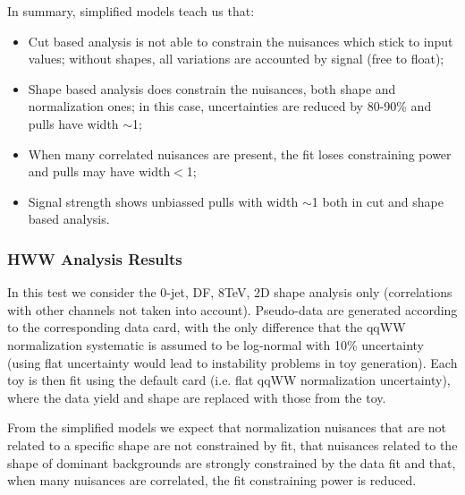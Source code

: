 In summary, simplified models teach us that:
\begin{itemize}
\item Cut based analysis is not able to constrain the nuisances which stick to input values; 
without shapes, all variations are accounted by signal (free to float);
\item Shape based analysis does constrain the nuisances, both shape and normalization ones; 
in this case, uncertainties are reduced by 80-90\% and pulls have width $\sim$1;
\item When many correlated nuisances are present, the fit loses constraining power and pulls may have width$<$1;
\item Signal strength shows unbiassed pulls with width $\sim$1 both in cut and shape based analysis.
\end{itemize}

\clearpage

\subsubsection{HWW Analysis Results}

In this test we consider the 0-jet, DF, 8TeV, 2D shape analysis only (correlations with other channels not taken into account).
Pseudo-data are generated according to the corresponding data card, with the only difference that the qqWW normalization systematic is assumed to be
log-normal with 10\% uncertainty (using flat uncertainty would lead to instability problems in toy generation).
Each toy is then fit using the default card (i.e. flat qqWW normalization uncertainty), where the data yield and shape are replaced with those from the toy.

From the simplified models we expect that normalization nuisances that are not related to a specific shape are not constrained by fit, 
that nuisances related to the shape of dominant backgrounds are strongly constrained by the data fit and that, when many nuisances are correlated, 
the fit constraining power is reduced.

